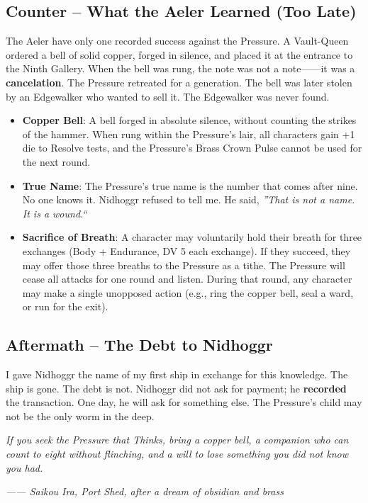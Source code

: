 \subsection{Counter -- What the Aeler Learned (Too Late)}

The Aeler have only one recorded success against the Pressure. A Vault-Queen ordered a bell of solid copper, forged in silence, and placed it at the entrance to the Ninth Gallery. When the bell was rung, the note was not a note------it was a \textbf{cancelation}. The Pressure retreated for a generation. The bell was later stolen by an Edgewalker who wanted to sell it. The Edgewalker was never found.

\begin{itemize}
    \item \textbf{Copper Bell}: A bell forged in absolute silence, without counting the strikes of the hammer. When rung within the Pressure's lair, all characters gain +1 die to Resolve tests, and the Pressure's Brass Crown Pulse cannot be used for the next round.
    \item \textbf{True Name}: The Pressure's true name is the number that comes after nine. No one knows it. Nidhoggr refused to tell me. He said, \emph{''That is not a name. It is a wound.``}
    \item \textbf{Sacrifice of Breath}: A character may voluntarily hold their breath for three exchanges (Body + Endurance, DV 5 each exchange). If they succeed, they may offer those three breaths to the Pressure as a tithe. The Pressure will cease all attacks for one round and listen. During that round, any character may make a single unopposed action (e.g., ring the copper bell, seal a ward, or run for the exit).
\end{itemize}

\subsection{Aftermath -- The Debt to Nidhoggr}

I gave Nidhoggr the name of my first ship in exchange for this knowledge. The ship is gone. The debt is not. Nidhoggr did not ask for payment; he \textbf{recorded} the transaction. One day, he will ask for something else. The Pressure's child may not be the only worm in the deep.

\emph{If you seek the Pressure that Thinks, bring a copper bell, a companion who can count to eight without flinching, and a will to lose something you did not know you had.}

\emph{------ Saikou Ira, Port Shed, after a dream of obsidian and brass}
